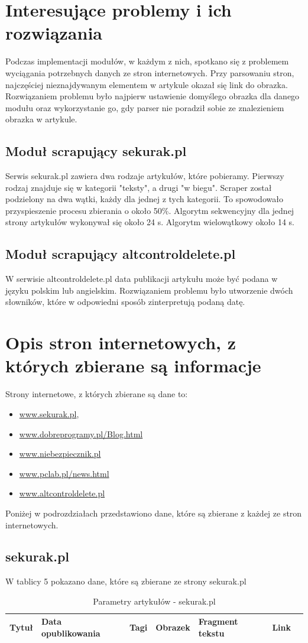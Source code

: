 \documentclass[12pt, titlepage]{article}
\begin{document}
	\section{Interesujące problemy i ich rozwiązania}
	Podczas implementacji modułów, w każdym z nich, spotkano się z problemem wyciągania potrzebnych danych ze stron internetowych. Przy parsowaniu stron, najczęściej nieznajdywanym elementem w artykule okazał się link do obrazka. Rozwiązaniem problemu było najpierw ustawienie domyślego obrazka dla danego modułu oraz wykorzystanie go, gdy parser nie poradził sobie ze znalezieniem obrazka w artykule.   
		\subsection{Moduł scrapujący sekurak.pl}
			Serwis sekurak.pl zawiera dwa rodzaje artykułów, które pobieramy. Pierwszy rodzaj znajduje się w kategorii "teksty", a drugi "w biegu". Scraper został podzielony na dwa wątki, każdy dla jednej z tych kategorii. To spowodowało przyspieszenie procesu zbierania o około 50\%. Algorytm sekwencyjny dla jednej strony artykułów wykonywał się około 24 s. Algorytm wielowątkowy około 14 s.
		\subsection{Moduł scrapujący altcontroldelete.pl}
			W serwisie altcontroldelete.pl data publikacji artykułu może być podana w języku polskim lub angielskim. Rozwiązaniem problemu było utworzenie dwóch słowników, które w odpowiedni sposób zinterpretują podaną datę. 
	\newpage
	\section{Opis stron internetowych, z których zbierane są informacje}
	Strony internetowe, z których zbierane są dane to:
	\begin{itemize}
	\item \url{www.sekurak.pl},
	\item \url{www.dobreprogramy.pl/Blog.html}
	\item \url{www.niebezpiecznik.pl}
	\item \url{www.pclab.pl/news.html}
	\item \url{www.altcontroldelete.pl}
	\end{itemize}  
	Poniżej w podrozdziałach przedstawiono dane, które są zbierane z każdej ze stron internetowych.
		\subsection{sekurak.pl}
		W tablicy 5 pokazano dane, które są zbierane ze strony sekurak.pl
		\begin{table}[H]
			\centering
			\caption{Parametry artykułów - sekurak.pl}
			\label{sekurak_parametry}
			\begin{tabular}{ | C{2cm} | C{4cm} | C{2cm} | C{2cm} | C{3cm} | C{2cm} | @{}m{0pt}@{}}
				\hline
				Tytuł & Data opublikowania & Tagi & Obrazek & Fragment tekstu & Link &\\[0.5cm]
				\hline
			\end{tabular}
		\end{table}
\end{document}
